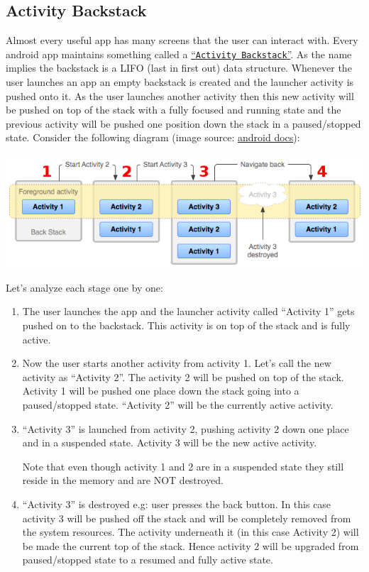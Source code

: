 \subsection{Activity Backstack}

Almost every useful app has many screens that the user can interact with. Every android app maintains something called a \href{https://developer.android.com/guide/components/tasks-and-back-stack.html}{``\texttt{Activity Backstack}''}. As the name implies the backstack is a LIFO (last in first out) data structure. Whenever the user launches an app an empty backstack is created and the launcher activity is pushed onto it. As the user launches another activity then this new activity will be pushed on top of the stack with a fully focused and running state and the previous activity will be pushed one position down the stack in a paused/stopped state. Consider the following diagram (image source: \href{https://developer.android.com/images/fundamentals/diagram_backstack.png}{android docs}):

\begin{center}
	\includegraphics[scale=0.4]{chapters/ch08/images/15}
\end{center}

Let's analyze each stage one by one:

\begin{enumerate}
	\item The user launches the app and the launcher activity called ``Activity 1'' gets pushed on to the backstack. This activity is on top of the stack and is fully active.
	
	\item Now the user starts another activity from activity 1. Let's call the new activity as ``Activity 2''. The activity 2 will be pushed on top of the stack. Activity 1 will be pushed one place down the stack going into a paused/stopped state. ``Activity 2'' will be the currently active activity.
	
	\item ``Activity 3'' is launched from activity 2, pushing activity 2 down one place and in a suspended state. Activity 3 will be the new active activity.
	
	Note that even though activity 1 and 2 are in a suspended state they still reside in the memory and are NOT destroyed.
	
	\item ``Activity 3'' is destroyed e.g: user presses the back button. In this case activity 3 will be pushed off the stack and will be completely removed from the system resources. The activity underneath it (in this case Activity 2) will be made the current top of the stack. Hence activity 2 will be upgraded from paused/stopped state to a resumed and fully active state.
\end{enumerate}

